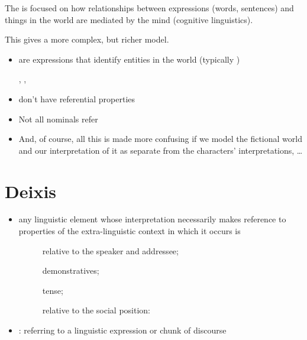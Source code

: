 \documentclass[a4paper,landscape,headrule,footrule,xetex,25pt]{foils}
\begin{document}
\vspace{-4em} The  is focused on how relationships between
 expressions (words, sentences) and things in the world are mediated by
 the mind (cognitive linguistics).  

This gives a more complex, but richer model.



\begin{itemize}
\item {} are expressions that identify
  entities in the world (typically )
  \begin{exe}
    \ex {}, 
    \ex {}, 
  \end{exe}
\item {} don't have referential properties
  \begin{exe}
    \ex {}
  \end{exe}
\item Not all nominals refer
  \begin{exe}
    \ex {}
    \ex {}
  \end{exe}
\item And, of course, all this is made more confusing if we model the
  fictional world and our interpretation of it as separate from the
  characters' interpretations, \ldots
\end{itemize}


\section{Deixis}

\begin{itemize}
\item any linguistic element whose interpretation
  necessarily makes reference to properties of the
  extra-linguistic context in which it occurs is 
  \begin{description}
  \item[] relative to the speaker and addressee; 
  \item[] demonstratives; 
  \item[] tense; 
  \item[] relative to the social position: 
  \end{description}
\item {}: referring to a linguistic expression or chunk of discourse
\end{itemize}
\end{document}
